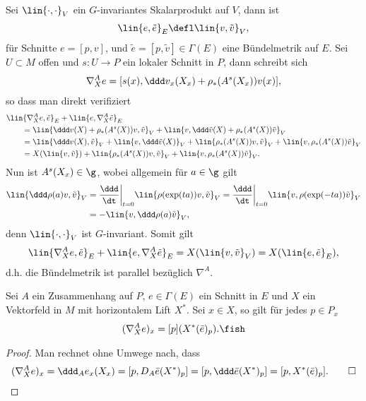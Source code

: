 \documentclass[%
	paper=a5,%
	fleqn,%
	DIV=18,%
	BCOR=0mm,
	fontsize=11pt,
	titlepage=false,%
	bibliography=totoc,
	DIV=18,%
	twoside=true,
	pdftitle=Riemannsche Geometrie,
	pdfauthor=Uwe Semmelmann,
	numbers=noendperiod]%
	{scrbook}
\begin{document}
\begin{rem}
Sei $\lin{\cdot,\cdot}_V$ ein $G$-invariantes Skalarprodukt auf $V$, dann ist
\begin{align*}
\lin{e,\tilde{e}}_E\defl  \lin{v,\tilde{v}}_V,
\end{align*}
für Schnitte $e = [p,v]$, und $\tilde{e}=[p,\tilde{v}]\in\Gamma(E)$
eine Bündelmetrik auf $E$. Sei $U\subset M$ offen und $s\colon U\to P$ ein lokaler
Schnitt in $P$, dann schreibt sich
\begin{align*}
\nabla_X^A e = [s(x),\ddd v_x(X_x) + \rho_*(A^s(X_x))v(x)],
\end{align*}
so dass man direkt verifiziert
\begin{align*}
&\lin{\nabla_X^A e,\tilde{e}}_E + \lin{e,\nabla_X^A \tilde{e}}_E \\ 
&\qquad = 
\lin{\ddd v(X) + \rho_*(A^s(X))v,\tilde{v}}_V + \lin{v,\ddd\tilde{v}(X) +
\rho_*(A^s(X))\tilde{v}}_V\\
&\qquad=
\lin{\ddd v(X),\tilde{v}}_V + 
\lin{v,\ddd \tilde{v}(X)}_V +
\lin{\rho_*(A^s(X))v,\tilde{v}}_V + \lin{v,\rho_*(A^s(X))\tilde{v}}_V\\
&\qquad=
X(\lin{v,\tilde{v}}) + \lin{\rho_*(A^s(X))v,\tilde{v}}_V +
\lin{v,\rho_*(A^s(X))\tilde{v}}_V.
\end{align*}
Nun ist $A^s(X_x)\in \g$, wobei allgemein für $a\in\g$ gilt
\begin{align*}
\lin{\ddd\rho(a)v,\tilde{v}}_V &= 
\frac{\ddd}{\dt}\bigg|_{t=0} \lin{\rho(\exp(ta))v,\tilde{v}}_V
=
\frac{\ddd}{\dt}\bigg|_{t=0} \lin{v,\rho(\exp(-ta))\tilde{v}}_V\\
&=
-\lin{v,\ddd\rho(a)\tilde{v}}_V,
\end{align*}
denn $\lin{\cdot,\cdot}_V$ ist $G$-invariant. Somit gilt
\begin{align*}
\lin{\nabla_X^A e,\tilde{e}}_E + \lin{e,\nabla_X^A \tilde{e}}_E = 
X(\lin{v,\tilde{v}}_V) = 
X(\lin{e,\tilde{e}}_E),
\end{align*}
d.h. die Bündelmetrik ist parallel bezüglich $\nabla^A$.\map
\end{rem}

\begin{lem}
Sei $A$ ein Zusammenhang auf $P$, $e\in \Gamma(E)$ ein Schnitt in $E$ und $X$
ein Vektorfeld in $M$ mit horizontalem Lift $X^*$. Sei $x\in X$, so gilt für
jedes $p\in P_x$
\begin{align*}
(\nabla_X^A e)_x = [p](X^*(\bar{e})_p).\fish
\end{align*} 
\end{lem}
\begin{proof}
Man rechnet ohne Umwege nach, dass
\begin{align*}
(\nabla_X^A e)_x = \ddd_A e_x(X_x) = 
[p,D_A \bar{e}(X^*)_p]
=
[p,\ddd \bar{e}(X^*)_p]
= [p,X^*(\bar{e})_p].\qed
\end{align*}
\end{proof}
\end{document}
